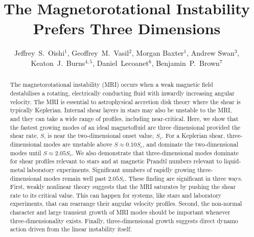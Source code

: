 \documentclass[openacc]{rsproca_new}%
\begin{document}
\title{The Magnetorotational Instability Prefers Three Dimensions}

\author{%
Jeffrey~S.~Oishi$^{1}$, Geoffrey~M.~Vasil$^{2}$, Morgan Baxter$^{1}$,
Andrew Swan$^{3}$, Keaton~J.~Burns$^{4,5}$, Daniel~Lecoanet$^6$, Benjamin~P.~Brown$^7$}

\address{Loads of places}

\begin{abstract}
The magnetorotational instability (MRI) occurs when a weak magnetic field destabilises a rotating, electrically conducting fluid with inwardly increasing angular velocity.
The MRI is essential to astrophysical accretion disk theory where the shear is typically Keplerian.
Internal shear layers in stars may also be unstable to the MRI, and they can take a wide range of profiles, including near-critical.
Here, we show that the fastest growing modes of an ideal magnetofluid are three dimensional provided the shear rate, $S$, is near the two-dimensional onset value, $S_c$.
For a Keplerian shear, three-dimensional modes are unstable above $S\approx0.10S_c$, and dominate the two-dimensional modes until $S\approx2.05S_{c}$.
We also demonstrate that three-dimensional modes dominate for shear profiles relevant to stars and at magnetic Prandtl numbers relevant to liquid-metal laboratory experiments.
Significant numbers of rapidly growing three-dimensional modes remain well past $2.05S_{c}$. 
These finding are significant in three ways. 
First, weakly nonlinear theory suggests that the MRI saturates by pushing the shear rate to its critical value. 
This can happen for systems, like stars and laboratory experiments, that can rearrange their angular velocity profiles.
Second, the non-normal character and large transient growth of MRI modes should be important whenever three-dimensionality exists.
Finally, three-dimensional growth suggests direct dynamo action driven from the linear instability itself.
\end{abstract}
\end{document}
